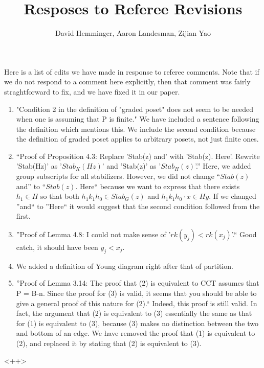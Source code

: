\documentclass[10 pt]{amsart}
\title{Resposes to Referee Revisions}
\author{David Hemminger, Aaron Landesman, Zijian Yao}
\theoremstyle{plain}
\theoremstyle{definition}
\theoremstyle{remark}
\numberwithin{equation}{section}
\begin{document}
\maketitle

Here is a list of edits we have made in response to referee comments.
Note that if we do not respond to a comment here explicitly, then
that comment was fairly straghtforward to fix, and we have
fixed it in our paper.

\begin{enumerate}
	\item "Condition 2 in the definition of "graded poset" does not seem to be needed when one is assuming that P is finite."
We have included a sentence
		following the definition which mentions this.
		We include the second condition because the definition of graded poset applies to arbitrary
		posets, not just finite ones. 
	\item  ``Proof of Proposition 4.3:  Replace 'Stab(z) and' with 'Stab(z). Here'.  Rewrite 'Stab(Hz)' as '$Stab_K(Hz)$' and 'Stab(z)' as '$Stab_H(z)$'.''
		Here, we added group subscripts for all stabilizers.
		However, we did not change ``$Stab(z)$ and'' to ``$Stab(z)$. Here`` because we want to express that there exists $h_1 \in H$ so that both
		$h_1 k_1 h_0 \in Stab_G(z)$ and $h_1k_1h_0 \cdot x \in Hy$.
		If we changed ''and`` to ''Here`` it would suggest
		that the second condition followed from the first.
	\item ''Proof of Lemma 4.8:  I could not make sense of '$rk(y_j) < rk(x_j)$'.`` Good catch, it should have been $y_j < x_j$.
	\item We added a definition of Young diagram right after that of partition.
	\item ''Proof of Lemma 3.14:  The proof that (2) is equivalent to CCT assumes that P = B-n.  Since the proof for (3) is valid, it seems that you should be able to give a general proof of this nature for (2).``
		Indeed, this proof is still valid. In fact, the argument that (2) is equivalent to (3) essentially the same as that for (1) is equivalent to (3), because (3) makes no distinction between the two and bottom of an edge. We have removed the proof that (1) is equivalent to (2), and replaced it by stating that (2) is equivalent to (3).
\end{enumerate}<++>
\end{document}
